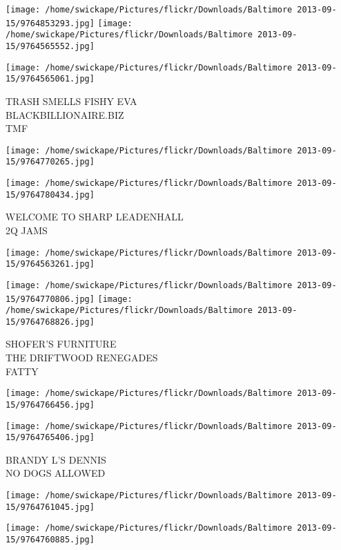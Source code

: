\documentclass[10pt,letterpaper]{article}
\begin{document}
\texttt{[image: /home/swickape/Pictures/flickr/Downloads/Baltimore 2013-09-15/9764853293.jpg]}
\texttt{[image: /home/swickape/Pictures/flickr/Downloads/Baltimore 2013-09-15/9764565552.jpg]}

\texttt{[image: /home/swickape/Pictures/flickr/Downloads/Baltimore 2013-09-15/9764565061.jpg]}

TRASH SMELLS FISHY EVA\\
BLACKBILLIONAIRE.BIZ\\
TMF
\pagebreak

\texttt{[image: /home/swickape/Pictures/flickr/Downloads/Baltimore 2013-09-15/9764770265.jpg]}

\vspace{0.25in}
\texttt{[image: /home/swickape/Pictures/flickr/Downloads/Baltimore 2013-09-15/9764780434.jpg]}

WELCOME TO SHARP LEADENHALL\\
2Q JAMS
\pagebreak

\texttt{[image: /home/swickape/Pictures/flickr/Downloads/Baltimore 2013-09-15/9764563261.jpg]}

\vspace{0.25in}
\texttt{[image: /home/swickape/Pictures/flickr/Downloads/Baltimore 2013-09-15/9764770806.jpg]}
\texttt{[image: /home/swickape/Pictures/flickr/Downloads/Baltimore 2013-09-15/9764768826.jpg]}

SHOFER'S FURNITURE\\
THE DRIFTWOOD RENEGADES\\
FATTY
\pagebreak

\texttt{[image: /home/swickape/Pictures/flickr/Downloads/Baltimore 2013-09-15/9764766456.jpg]}

\vspace{0.25in}
\texttt{[image: /home/swickape/Pictures/flickr/Downloads/Baltimore 2013-09-15/9764765406.jpg]}

BRANDY L'S DENNIS\\
NO DOGS ALLOWED
\pagebreak

\texttt{[image: /home/swickape/Pictures/flickr/Downloads/Baltimore 2013-09-15/9764761045.jpg]}

\vspace{0.25in}
\texttt{[image: /home/swickape/Pictures/flickr/Downloads/Baltimore 2013-09-15/9764760885.jpg]}
\end{document}
